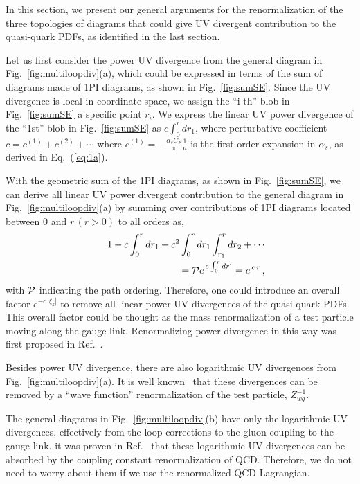 \documentclass[twocolumn,aps,prd,superscriptaddress,nofootinbib,showpacs]{revtex4}
\begin{document}
In this section, we present our general arguments for the renormalization of the three topologies of diagrams that could give UV divergent contribution to the quasi-quark PDFs, as identified in the last section.

Let us first consider the power UV divergence from the general diagram in Fig.~\ref{fig:multiloopdiv}(a), which could be expressed in terms of the sum of diagrams made of 1PI diagrams, as shown in Fig.~\ref{fig:sumSE}.  Since the UV divergence is local in coordinate space, we assign the ``i-th'' blob in Fig.~\ref{fig:sumSE} a specific point $r_i$. We express the linear UV power divergence of the ``1st'' blob in Fig.~\ref{fig:sumSE} as $c \int_0^{r} d r_1$, where perturbative coefficient $c=c^{(1)}+c^{(2)}+\cdots$ where $c^{(1)}=-\frac{\alpha_s C_F}{\pi}\frac{1}{a} $ is the first order expansion in $\alpha_s$, as derived in Eq.~(\ref{eq:1a}).

With the geometric sum of the 1PI diagrams, as shown in Fig.~\ref{fig:sumSE}, we can derive all linear UV power divergent contribution to the general diagram in Fig.~\ref{fig:multiloopdiv}(a) by summing over contributions of 1PI diagrams located between 0 and $r\,(r>0)$ to all orders as,
\begin{eqnarray}
&\ & 1+ c \int_0^{r} d r_1 + c^2 \int_0^{r} d r_1 \int_{r_1}^{r} d r_2 + \cdots
\nonumber \\
&\ & \hskip 0.3in
= {\cal P} e^{\, c \int_0^r dr'} = e^{\, c\, r}\, ,
\end{eqnarray}
with ${\cal P}$ indicating the path ordering.
Therefore, one could introduce an overall factor $e^{-c\, |\xi_z|}$ to remove all linear power UV divergences of the quasi-quark PDFs. This overall factor could be thought as the mass renormalization of a test particle moving along the gauge link. Renormalizing power divergence in this way was first proposed in Ref.~\cite{Polyakov:1980ca}.

Besides power UV divergence, there are also logarithmic UV divergences from Fig.~\ref{fig:multiloopdiv}(a).  It is well known~\cite{Dotsenko:1979wb} that these divergences can be removed by a ``wave function'' renormalization of the test particle, $Z_{wq}^{-1}$.

The general diagrams in Fig.~\ref{fig:multiloopdiv}(b) have only the logarithmic UV divergences, effectively from the loop corrections to the gluon coupling to the gauge link.  it was proven in Ref.~\cite{Dotsenko:1979wb} that these logarithmic UV divergences can be absorbed by the coupling constant renormalization of QCD. Therefore, we do not need to worry about them if we use the renormalized QCD Lagrangian.
\end{document}
